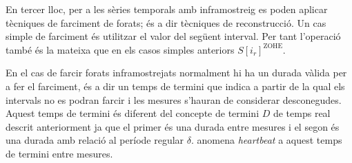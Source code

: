 En tercer lloc, per a les sèries temporals amb inframostreig es poden
aplicar tècniques de farciment de forats; és a dir tècniques de
reconstrucció. Un cas simple de farciment és utilitzar el valor del
següent interval. Per tant l'operació també és la mateixa que en els
casos simples anteriors $S[i_r]^\text{ZOHE}$.

En el cas de farcir forats inframostrejats normalment hi ha un durada
vàlida per a fer el farciment, és a dir un temps de termini que indica
a partir de la qual els intervals no es podran farcir i les mesures
s'hauran de considerar desconegudes. Aquest temps de termini és
diferent del concepte de termini $D$ de temps real descrit
anteriorment ja que el primer és una durada entre mesures i el segon
és una durada amb relació al període regular
$\delta$. \Textcite{rrdtool} anomena \emph{heartbeat} a aquest temps
de termini entre mesures.






















